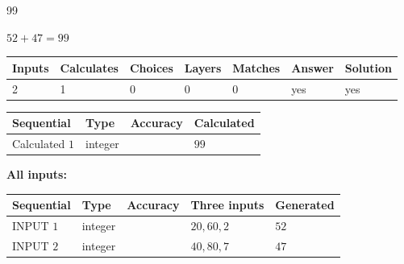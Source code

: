 \documentclass[12pt]{article}
\begin{document}
 
 
\noindent{}
 
 

99
 
 
\noindent{}
 
 

 
 
 
\noindent{}
 
 

$ %
52 +  %
47=   %
99$
 
 
\noindent{}
 
 

 
   
   
   
   
\noindent\begin{tabular}{|l|l|l|l|l|l|l|}
 \hline
Inputs & Calculates & Choices & Layers & Matches & Answer & Solution \\ \hline
 2  & 
 1  & 
 0
  & 
 0  & 
 0  & 
  yes & 
  yes 
  \\ \hline
 \end{tabular}
   
   
   
   
\noindent{}
   
   
  
  
\noindent\begin{tabular}{|l|l|l|l|}
\hline
 Sequential & Type & Accuracy & Calculated \\ 
\hline
 
 
  Calculated $  1 $ & integer &  & 
  $ 99 $ 
 \\  \hline  
 \end{tabular}
   
   
   
   
\noindent\vspace{0.1in}\hspace{-0.08in} {\textbf{\Large{All inputs: }}}
   
   
  
  
\noindent\begin{tabular}{|l|l|l|l|l|}
\hline
 Sequential & Type & Accuracy & Three inputs & Generated \\ 
\hline
 
 
  INPUT $  1 $ & integer &  & $
 20
 , 
 60
 , 
 2
 $ & $ 52 $ 
 \\  \hline  
 
 
  INPUT $  2 $ & integer &  & $
 40
 , 
 80
 , 
 7
 $ & $ 47 $ 
 \\  \hline  
 \end{tabular}
   
\end{document}

